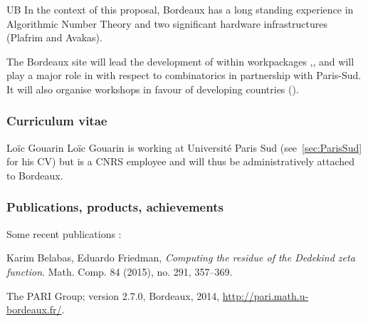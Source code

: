 \begin{sitedescription}{UB}
\medskip
In the context of this proposal, Bordeaux has a long standing experience in
Algorithmic Number Theory and two significant hardware infrastructures
(Plafrim and Avakas).

The Bordeaux site will lead the development of \PariGP within
workpackages ,,  and will play
a major role in  with respect to combinatorics in partnership with Paris-Sud.
It will also organise workshops in favour of developing countries ().

\subsubsection*{Curriculum vitae}







\begin{participant}[type=R,PM=6,gender=male,salary=5600]{Lo\"ic Gouarin}
  Loïc Gouarin is working at Université Paris Sud
  (see~\ref{sec:ParisSud} for his CV) but is a CNRS employee and will
  thus be administratively attached to Bordeaux.
\end{participant}



\subsubsection*{Publications, products, achievements}

Some recent publications :
\begin{compactenum}
\item 
Karim Belabas, Eduardo Friedman,
\textit{Computing the residue of the Dedekind zeta function}.
Math. Comp. 84 (2015), no. 291, 357--369. 

\item
The PARI Group; \PariGP version 2.7.0, Bordeaux, 2014,
\url{http://pari.math.u-bordeaux.fr/}.


\end{compactenum}
\end{sitedescription}

